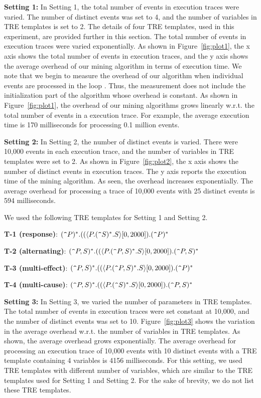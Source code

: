 \documentclass[]{sigplanconf}
\begin{document}
\noindent \textbf{Setting 1:}
In Setting 1, the total number of events in execution traces were varied. The number of distinct events was set to 4, and the number of variables in TRE templates is set to 2. The details of four TRE templates, used in this experiment, are provided further in this section. The total number of events in execution traces were varied exponentially. As shown in Figure~\ref{fig:plot1}, the x axis shows the total number of events in execution traces, and the y axis shows the average overhead of our mining algorithm in terms of execution time. We note that we begin to measure the overhead of our algorithm when individual events are processed in the loop . Thus, the measurement does not include the initialization part of the algorithm whose overhead is constant. As shown in Figure~\ref{fig:plot1}, the overhead of our mining algorithms grows linearly w.r.t. the total number of events in a execution trace. For example, the average execution time is 170 milliseconds for processing 0.1 million events.

\noindent \textbf{Setting 2:}
In Setting 2, the number of distinct events is varied. There were 10,000 events in each execution trace, and the number of variables in TRE templates were set to 2. As shown in Figure~\ref{fig:plot2}, the x axis shows the number of distinct events in execution traces. The y axis reports the execution time of the mining algorithm. As seen, the overhead increases exponentially. The average overhead for processing a trace of 10,000 events with 25 distinct events is 594 milliseconds.

We used the following TRE templates for Setting 1 and Setting 2.

\noindent \textbf{T-1 (response)}: $(\verb!^!P)^*.((\langle P.(\verb!^!S)^*.S\rangle[0, 2000]).(\verb!^!P)^*$

\noindent \textbf{T-2 (alternating)}: $(\verb!^!P,S)^*.((\langle P.(\verb!^!P,S)^*.S\rangle[0, 2000]).(\verb!^!P,S)^*$

\noindent \textbf{T-3 (multi-effect)}: $(\verb!^!P,S)^*.((\langle P.(\verb!^!P,S)^*.S\rangle[0, 2000]).(\verb!^!P)^*$

\noindent \textbf{T-4 (multi-cause)}: $(\verb!^!P,S)^*.((\langle P.(\verb!^!S)^*.S\rangle[0, 2000]).(\verb!^!P,S)^*$

\noindent \textbf{Setting 3:}
In Setting 3, we varied the number of parameters in TRE templates. The total number of events in execution traces were set constant at 10,000, and the number of distinct events was set to 10. Figure~\ref{fig:plot3} shows the variation in the average overhead w.r.t. the number of variables in TRE templates. As shown, the average overhead grows exponentially. The average overhead for processing an execution trace of 10,000 events with 10 distinct events with a TRE template containing 4 variables is 4156 milliseconds. For this setting, we used TRE templates with different number of variables, which are similar to the TRE templates used for Setting 1 and Setting 2. For the sake of brevity, we do not list these TRE templates.
\end{document}
